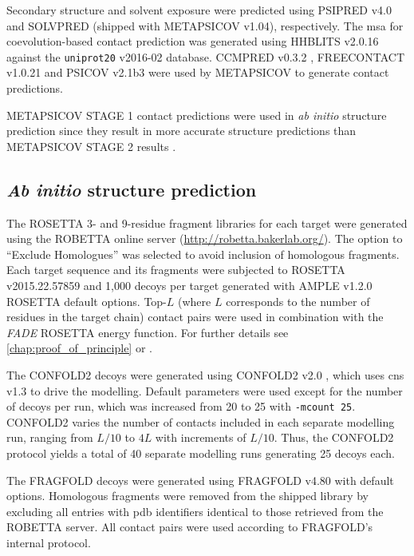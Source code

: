 Secondary structure and solvent exposure were predicted using PSIPRED v4.0 \cite{Jones1999-ed} and SOLVPRED (shipped with METAPSICOV v1.04), respectively. The \gls{msa} for coevolution-based contact prediction was generated using HHBLITS v2.0.16 \cite{Remmert2011-kt} against the \texttt{uniprot20} v2016-02 database. CCMPRED v0.3.2 \cite{Seemayer2014-zp}, FREECONTACT v1.0.21 \cite{Kajan2014-bx} and PSICOV v2.1b3 \cite{Jones2012-ks} were used by METAPSICOV to generate contact predictions.

METAPSICOV STAGE 1 contact predictions were used in \textit{ab initio} structure prediction since they result in more accurate structure predictions than METAPSICOV STAGE 2 results \cite{Jones2015-vq}.

\subsection{\textit{Ab initio} structure prediction} \label{sec:ample_saint2_modelling}
The ROSETTA 3- and 9-residue fragment libraries for each target were generated using the ROBETTA online server (\url{http://robetta.bakerlab.org/}). The option to ``Exclude Homologues'' was selected to avoid inclusion of homologous fragments. Each target sequence and its fragments were subjected to ROSETTA v2015.22.57859 \cite{Rohl2004-dj} and 1,000 decoys per target generated with AMPLE v1.2.0 ROSETTA default options. Top-$L$ (where $L$ corresponds to the number of residues in the target chain) contact pairs were used in combination with the \textit{FADE} ROSETTA energy function. For further details see \cref{chap:proof_of_principle} or \textcite{Michel2014-eg}.

The CONFOLD2 decoys were generated using CONFOLD2 v2.0 \cite{Adhikari2018-lj}, which uses \gls{cns} v1.3 \cite{Brunger1998-sz} to drive the modelling. Default parameters were used except for the number of decoys per run, which was increased from 20 to 25 with \texttt{-mcount 25}. CONFOLD2 varies the number of contacts included in each separate modelling run, ranging from $L/10$ to $4L$ with increments of $L/10$. Thus, the CONFOLD2 protocol yields a total of 40 separate modelling runs generating 25 decoys each.

The FRAGFOLD decoys were generated using FRAGFOLD v4.80 \cite{Jones2001-mc} with default options. Homologous fragments were removed from the shipped library  by excluding all entries with \gls{pdb} identifiers identical to those retrieved from the ROBETTA server. All contact pairs were used according to FRAGFOLD's internal protocol.

